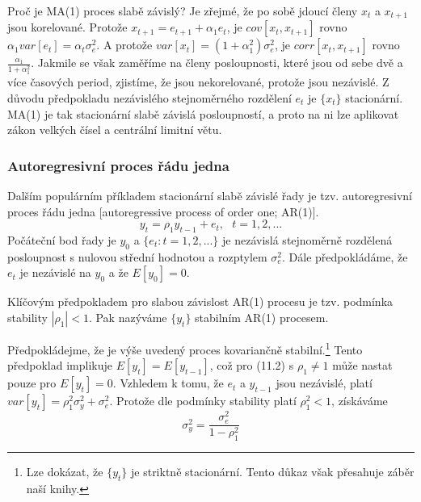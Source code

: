 Proč je MA(1) proces slabě závislý? Je zřejmé, že po sobě 
jdoucí členy $x_t$ a $x_{t + 1}$ jsou 
korelované. Protože $x_{t + 1} = e_{t + 1} + \alpha_1 e_t$, je 
$cov[x_t, x_{t + 1}]$ rovno $\alpha_1 var[e_t] = \alpha_t \sigma^2_e$. 
A protože $var[x_t] = (1 + \alpha_1^2)\sigma^2_e$, je $corr[x_t, x_{t + 
1}]$ rovno $\frac{\alpha_1}{1 + \alpha_1^2}$. Jakmile se však 
zaměříme na členy posloupnosti, které jsou od sebe dvě a více 
časových period, zjistíme, že jsou nekorelované, protože jsou 
nezávislé. Z důvodu předpokladu nezávislého stejnoměrného 
rozdělení $e_t$ je $\{x_t\}$ stacionární. MA(1) je tak
stacionární slabě závislá posloupností, a proto na ni lze aplikovat 
zákon velkých čísel a centrální limitní větu.

\subsubsection{Autoregresivní proces řádu jedna}

Dalším populárním příkladem stacionární slabě závislé řady 
je tzv. autoregresivní proces řádu jedna [autoregressive process of 
order one; AR(1)].
\begin{equation}
y_t = \rho_1 y_{t - 1} + e_t, ~~~ t = 1, 2, ...
\end{equation}
Počáteční bod řady je $y_0$ a $\{e_t: t = 1, 2, ... \}$ je 
nezávislá stejnoměrně rozdělená posloupnost s nulovou střední 
hodnotou a rozptylem $\sigma^2_e$. Dále předpokládáme, že $e_t$ je 
nezávislé na $y_0$ a že $E[y_0] = 0$.

Klíčovým předpokladem pro slabou závislost AR(1) procesu je tzv. 
podmínka stability $|\rho_1| < 1$. Pak nazýváme $\{y_t\}$ stabilním 
AR(1) procesem.

Předpokládejme, že je výše uvedený proces kovariančně 
stabilní.\footnote{Lze dokázat, že $\{y_t\}$ je striktně 
stacionární. Tento důkaz však přesahuje záběr naší knihy.} 
Tento předpoklad implikuje $E[y_t] = E[y_{t - 1}]$, což pro (11.2) s 
$\rho_1 \ne 1$ může nastat pouze pro $E[y_t] = 0$. Vzhledem k tomu, 
že $e_t$ a $y_{t - 1}$ jsou nezávislé, platí $var[y_t] = \rho_1^2 
\sigma^2_y + \sigma_e^2$. Protože dle podmínky stability platí 
$\rho_1^2 < 1$, získáváme
\begin{equation}
\sigma^2_y = \frac{\sigma_e^2}{1 - \rho_1^2}
\end{equation}

